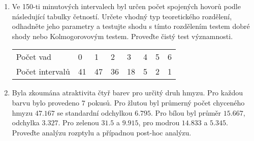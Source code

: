 \documentclass[a4paper,12pt]{article}
\begin{document}
\begin{enumerate}
  \item Ve 150-ti minutových intervalech byl určen počet spojených hovorů podle následující tabulky četností.
        Určete vhodný typ teoretického rozdělení, odhadněte jeho parametry a testujte shodu s tímto rozdělením 
        testem dobré shody nebo Kolmogorovovým testem. Proveďte čistý test významnosti.
    \begin{center}
    \begin{tabular}{llllllll}
    Počet vad           &0& 1& 2& 3& 4& 5& 6\\
    Počet intervalů     &41& 47& 36& 18& 5& 2& 1
    \end{tabular}
    \end{center}

    
    
    
    \item Byla zkoumána atraktivita čtyř barev pro určitý druh hmyzu. Pro každou barvu bylo provedeno $7$ pokusů.
    Pro žlutou byl průmerný počet chyceného hmyzu $47.167$ se standardní odchylkou $6.795$. Pro bílou byl průměr 
    $15.667$, odchylka $3.327$. Pro zelenou $31.5$ a $9.915$, pro modrou $14.833$ a $5.345$. Proveďte analýzu rozptylu 
    a případnou post-hoc analýzu.

\end{enumerate}
\end{document}
